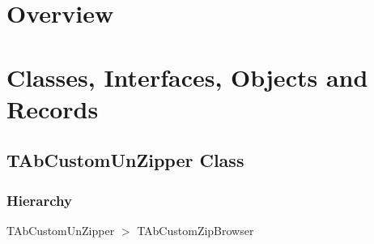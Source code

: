 \documentclass{report}
\newif\ifpdf
\begin{document}
\section{Overview}
\begin{description}
\item[\texttt{\begin{ttfamily}TAbCustomUnZipper\end{ttfamily} Class}]
\item[\texttt{\begin{ttfamily}TAbUnZipper\end{ttfamily} Class}]
\end{description}
\section{Classes, Interfaces, Objects and Records}
\ifpdf
\subsection*{\large{\textbf{TAbCustomUnZipper Class}}\normalsize\hspace{1ex}\hrulefill}
\else
\subsection*{TAbCustomUnZipper Class}
\fi
\label{AbUnzper.TAbCustomUnZipper}
\subsubsection*{\large{\textbf{Hierarchy}}\normalsize\hspace{1ex}\hfill}
TAbCustomUnZipper {$>$} TAbCustomZipBrowser
\end{document}

